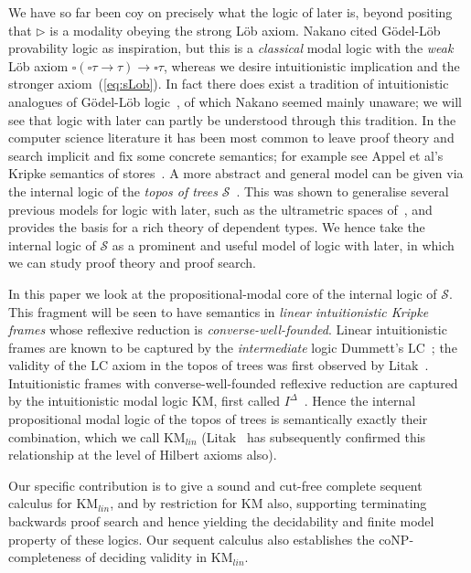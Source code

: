 \documentclass[envcountsect,envcountsame]{llncs}
\newcommand{\eqref}[1]{(\ref{#1})}
\newcommand{\lcnxt}{\mathrm{KM}_{lin}}
\newcommand{\lgkm}{\mathrm{KM}}
\newcommand{\lglc}{\mathrm{LC}}
\newcommand{\limp}{\rightarrow}
\newcommand{\nxt}{\rhd}
\newcommand{\trees}{\mathcal{S}}
\begin{document}
We have so far been coy on precisely what the logic of later is, beyond positing
that $\nxt$ is a modality obeying the strong L\"ob axiom. Nakano cited G\"odel-L\"ob
provability logic as inspiration, but this is a \emph{classical} modal logic with the
\emph{weak} L\"ob axiom $\square(\square\tau\limp\tau)\limp\square\tau$, whereas
we desire intuitionistic implication and the stronger axiom~\eqref{eq:sLob}. In fact
there does exist a tradition of intuitionistic analogues of 
G\"odel-L\"ob logic~\cite{Litak:Constructive}, 
of which Nakano seemed mainly unaware; we will see
that logic with later can partly be understood through this
tradition. In the computer science literature it has been most common
to leave proof theory and search implicit and fix some
concrete semantics; for example see Appel et al's Kripke semantics
of stores~\cite{Appel:Very}. A more abstract and general model can be given via the
internal logic of the \emph{topos of trees} $\trees$~\cite{Birkedal:First}.
This was shown to generalise several previous models for logic with later, such as
the ultrametric spaces of~\cite{Birkedal:Metric,Krishnaswami:Ultrametric}, and provides
the basis for a rich theory of dependent types. We hence take the internal logic of
$\trees$ as a prominent and useful model of logic with later, in which we can study
proof theory and proof search.

In this paper we look at the propositional-modal core of the internal
logic of $\trees$.  This fragment will be seen to have semantics in
\emph{linear intuitionistic Kripke frames} whose reflexive reduction is
\emph{converse-well-founded}.
Linear intuitionistic frames
are known to be captured by the \emph{intermediate} logic Dummett's
$\lglc$~\cite{chagrov-zakharyaschev-modal-logic};
the validity of the $\lglc$ axiom in the topos of trees was first observed
by Litak~\cite{Litak:Typing}. Intuitionistic
frames with converse-well-founded reflexive reduction are captured by the
intuitionistic modal logic $\lgkm$, first called
$I^\Delta$~\cite{Muravitsky:Logic}. Hence the internal
propositional modal logic of the topos of trees is semantically
exactly their combination, which we call $\lcnxt$
(Litak~\cite[Thm. 50]{Litak:Constructive} has subsequently confirmed this
relationship at the level of Hilbert axioms also).

Our specific contribution is to give a sound and cut-free complete
sequent calculus for $\lcnxt$, and by restriction for $\lgkm$ also, supporting
terminating backwards proof search and hence yielding the decidability
and finite model property of these logics. Our sequent calculus
also establishes the coNP-completeness of deciding validity in
$\lcnxt$.
\end{document}
